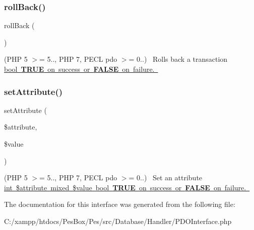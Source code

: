 \subsubsection{\texorpdfstring{roll\+Back()}{rollBack()}}
{\footnotesize\ttfamily roll\+Back (\begin{DoxyParamCaption}{ }\end{DoxyParamCaption})}

(P\+HP 5 $>$= 5.., P\+HP 7, P\+E\+CL pdo $>$= 0..)~\newline
 Rolls back a transaction \mbox{\hyperlink{}{bool {\bfseries T\+R\+UE} on success or {\bfseries F\+A\+L\+SE} on failure. }}\mbox{\label{interface_pes_1_1_database_1_1_handler_1_1_p_d_o_interface_aa4ddbee482d43ef83316a45744be018e}} 
\subsubsection{\texorpdfstring{set\+Attribute()}{setAttribute()}}
{\footnotesize\ttfamily set\+Attribute (\begin{DoxyParamCaption}\item[{}]{\$attribute,  }\item[{}]{\$value }\end{DoxyParamCaption})}

(P\+HP 5 $>$= 5.., P\+HP 7, P\+E\+CL pdo $>$= 0..)~\newline
 Set an attribute \mbox{\hyperlink{}{int \$attribute  mixed \$value  bool {\bfseries T\+R\+UE} on success or {\bfseries F\+A\+L\+SE} on failure. }}

The documentation for this interface was generated from the following file\+:\begin{DoxyCompactItemize}
\item 
C\+:/xampp/htdocs/\+Pes\+Box/\+Pes/src/\+Database/\+Handler/P\+D\+O\+Interface.\+php\end{DoxyCompactItemize}
